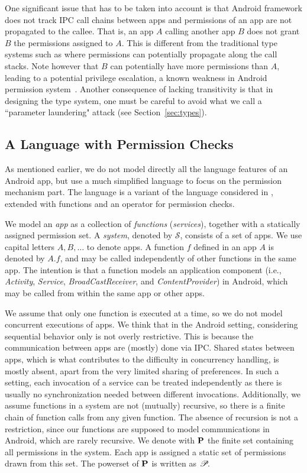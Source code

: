 One significant issue that has to be taken into account is that Android framework does not track IPC call chains between apps and permissions of an app are not propagated to the callee. That is, an app $A$ calling another app $B$ does not grant $B$ the permissions assigned to $A$. This is different from the traditional type systems such as {\BN} where permissions can potentially propagate along the call stacks. Note however that $B$ can potentially have more permissions than $A$, leading to a potential privilege escalation, a known weakness in Android permission system~\cite{Chin:2011wa}. Another consequence of lacking transitivity is that in designing the type system, one must be careful to avoid what we call a ``parameter laundering" attack (see Section~\ref{sec:types}).

\subsection{A Language with Permission Checks}\label{sec:language}

As mentioned earlier, we do not model directly all the language features of an Android app, but use a much simplified language to focus on the permission mechanism part. The language is a variant of the  language considered in \cite{Volpano:1996}, extended with functions and an operator for permission checks.

We model an \emph{app} as a collection of \emph{functions}
(\emph{services}), together with a statically assigned permission
set. A \emph{system}, denoted by $\mathcal{S}$, consists of a set of
apps. We use capital letters $A,B,\ldots$ to denote apps. A function
$f$ defined in an app $A$ is denoted by $A.f$, and may be called
independently of other functions in the same app. The intention is
that a function models an  application component (i.e.,
\emph{Activity}, \emph{Service}, \emph{BroadCastReceiver}, and
\emph{ContentProvider}) in Android, which may be called from within
the same app or other apps.

We assume that only one function is
executed at a time, so we do not model concurrent executions of
apps. We think that in the Android setting, considering sequential behavior only is
not overly restrictive. This is because the communication between apps are
(mostly) done via IPC. Shared states between apps,
which is what contributes to the difficulty in concurrency handling, is mostly
absent, apart from the very limited sharing of preferences. In such a setting,
each invocation of a service can be treated independently as there is usually
no synchronization needed between different invocations. Additionally, we assume functions in a system are not (mutually)
recursive, so there is a finite chain of function calls from any given
function. The absence of recursion is not a restriction, since our
functions are supposed to model communications in Android, which are
rarely recursive. We denote with $\mathbf{P}$ the finite set containing all permissions in
the system. Each app is assigned a static set of permissions drawn
from this set. The powerset of $\mathbf{P}$ is written as~$\!\mathscr{P}\!$.  


